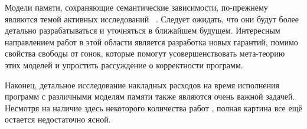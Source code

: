 Модели памяти, сохраняющие семантические зависимости, по-прежнему являются  темой активных исследований~%
\cite{Kang-al:POPL17, Lee-al:PLDI20, Cho-al:PLDI21,
Chakraborty-Vafeiadis:POPL19, Paviotti-al:ESOP20, 
Jagadeesan-al:OOPSLA2020}.
Следует ожидать, что они будут более детально разрабатываться и уточняться в ближайшем будущем. 
Интересным направлением работ в этой области 
является разработка новых гарантий, 
помимо свойства свободы от гонок, 
которые помогут усовершенствовать мета-теорию 
этих моделей и упростить рассуждение о корректности программ. 

Наконец, детальное исследование 
накладных расходов на время исполнения программ с различными моделям памяти также являются очень важной задачей. Несмотря на наличие здесь некоторого количества работ %
\cite{Singh-al:ISCA12, Liu-al:OOPSLA17, Liu-al:PLDI19, 
Vollmer-al:PPoPP17, Dolan-al:PLDI18, Ou-Demsky:OOPSLA18}, 
полная картина все ещё остается недостаточно ясной. 